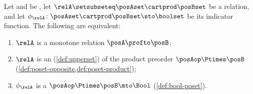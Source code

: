 \begin{lemma}
    \label{lem:monrel-as-bool-map}
    Let \posA and \posB be , let $\relA \setsubseteq \posAset \cartprod \posBset$ be a relation, and let $\phi_\relA \colon \posAset \cartprod \posBset \sto \boolset$ be its indicator function.
    The following are equivalent:
    \begin{enumerate}
        \item $\relA$ is a monotone relation $\posA \profto \posB$;
        \item $\relA$ is an  (\cref{def:upperset}) of the product preorder $\posAop \Ptimes \posB$ (\cref{def:poset-opposite,def:poset-product});
        \item $\phi_\relA$ is a  $\posAop \Ptimes \posB \mto \Bool$ (\cref{def:bool-poset}).
    \end{enumerate}
\end{lemma}
% 
% 

